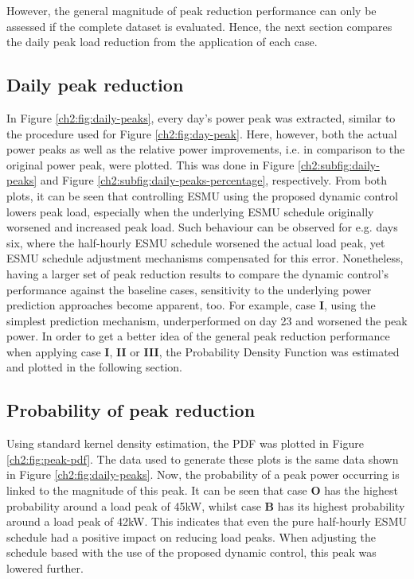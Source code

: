 

However, the general magnitude of peak reduction performance can only be assessed if the complete dataset is evaluated.
Hence, the next section compares the daily peak load reduction from the application of each case.

\subsection{Daily peak reduction}



In Figure \ref{ch2:fig:daily-peaks}, every day's power peak was extracted, similar to the procedure used for Figure \ref{ch2:fig:day-peak}.
Here, however, both the actual power peaks as well as the relative power improvements, i.e. in comparison to the original power peak, were plotted.
This was done in Figure \ref{ch2:subfig:daily-peaks} and Figure \ref{ch2:subfig:daily-peaks-percentage}, respectively.
From both plots, it can be seen that controlling ESMU using the proposed dynamic control lowers peak load, especially when the underlying ESMU schedule originally worsened and increased peak load.
Such behaviour can be observed for e.g. days six, where the half-hourly ESMU schedule worsened the actual load peak, yet ESMU schedule adjustment mechanisms compensated for this error.
Nonetheless, having a larger set of peak reduction results to compare the dynamic control's performance against the baseline cases, sensitivity to the underlying power prediction approaches become apparent, too.
For example, case \textbf{I}, using the simplest prediction mechanism, underperformed on day 23 and worsened the peak power.
In order to get a better idea of the general peak reduction performance when applying case \textbf{I}, \textbf{II} or \textbf{III}, the Probability Density Function was estimated and plotted in the following section.

\subsection{Probability of peak reduction}



Using standard kernel density estimation, the PDF was plotted in Figure \ref{ch2:fig:peak-pdf}.
The data used to generate these plots is the same data shown in Figure \ref{ch2:fig:daily-peaks}.
Now, the probability of a peak power occurring is linked to the magnitude of this peak.
It can be seen that case \textbf{O} has the highest probability around a load peak of 45kW, whilst case \textbf{B} has its highest probability around a load peak of 42kW.
This indicates that even the pure half-hourly ESMU schedule had a positive impact on reducing load peaks.
When adjusting the schedule based with the use of the proposed dynamic control, this peak was lowered further.


